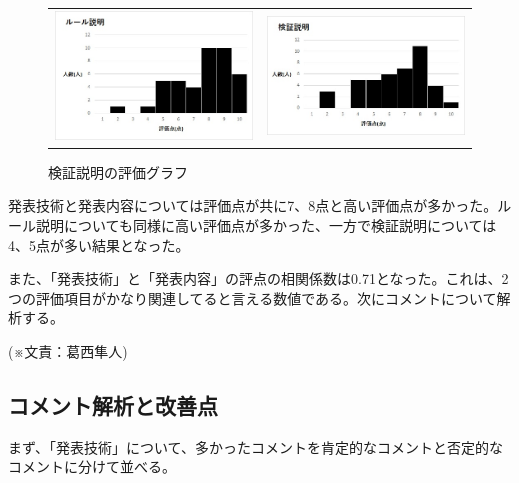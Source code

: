 \begin{figure}[h]
 \begin{tabular}{cc}
  \begin{minipage}[h]{0.45\hsize}
  \centering
 \includegraphics[width=0.7\linewidth]{./figure/ru-ru.jpg}
\caption{ルール説明の評価グラフ}
\label{ru-ru}
 \end{minipage} &

\begin{minipage}[h]{0.45\hsize}
  \centering
 \includegraphics[width=0.7\linewidth]{./figure/kensyou.jpg}
 \caption{検証説明の評価グラフ}
\label{kensyou}
\end{minipage} 
\end{tabular}
\end{figure}
発表技術と発表内容については評価点が共に7、8点と高い評価点が多かった。ルール説明についても同様に高い評価点が多かった、一方で検証説明については4、5点が多い結果となった。

また、「発表技術」と「発表内容」の評点の相関係数は0.71となった。これは、2つの評価項目がかなり関連してると言える数値である。次にコメントについて解析する。
\begin{flushright}
(※文責：葛西隼人)
\end{flushright}

\subsection{コメント解析と改善点}
まず、「発表技術」について、多かったコメントを肯定的なコメントと否定的なコメントに分けて並べる。

